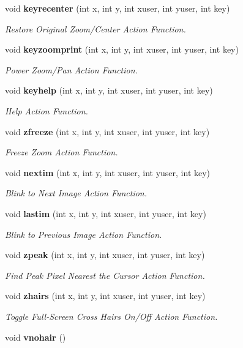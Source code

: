 \begin{CompactItemize}
void {\bf keyrecenter} (int x, int y, int xuser, int yuser, int key)
\begin{CompactList}\small\item\em Restore Original Zoom/Center Action Function. \item\end{CompactList}\item 
void {\bf keyzoomprint} (int x, int y, int xuser, int yuser, int key)
\begin{CompactList}\small\item\em Power Zoom/Pan Action Function. \item\end{CompactList}\item 
void {\bf keyhelp} (int x, int y, int xuser, int yuser, int key)
\begin{CompactList}\small\item\em Help Action Function. \item\end{CompactList}\item 
void {\bf zfreeze} (int x, int y, int xuser, int yuser, int key)
\begin{CompactList}\small\item\em Freeze Zoom Action Function. \item\end{CompactList}\item 
void {\bf nextim} (int x, int y, int xuser, int yuser, int key)
\begin{CompactList}\small\item\em Blink to Next Image Action Function. \item\end{CompactList}\item 
void {\bf lastim} (int x, int y, int xuser, int yuser, int key)
\begin{CompactList}\small\item\em Blink to Previous Image Action Function. \item\end{CompactList}\item 
void {\bf zpeak} (int x, int y, int xuser, int yuser, int key)
\begin{CompactList}\small\item\em Find Peak Pixel Nearest the Cursor Action Function. \item\end{CompactList}\item 
void {\bf zhairs} (int x, int y, int xuser, int yuser, int key)
\begin{CompactList}\small\item\em Toggle Full-Screen Cross Hairs On/Off Action Function. \item\end{CompactList}\item 
void {\bf vnohair} ()\label{xtvutils_8c_a221}


\end{CompactItemize}
